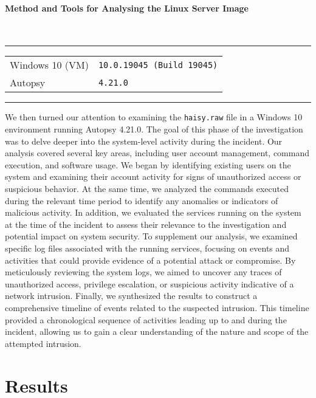 \paragraph{Method and Tools for Analysing the Linux Server Image}\mbox{}\\
\noindent\rule{\textwidth}{1pt}
\vspace{-0.8cm}
\begin{table}[h]
\begin{tabular}{ll}
Windows 10 (VM) & \texttt{10.0.19045 (Build 19045)}                                 \\
Autopsy      & \texttt{4.21.0}
\end{tabular}
\end{table}

\vspace{-0.8cm}
\noindent\rule{\textwidth}{1pt}
\vspace{-0.3cm}

\noindent We then turned our attention to examining the \texttt{haisy.raw} file in a Windows 10 environment running Autopsy 4.21.0. The goal of this phase of the investigation was to delve deeper into the system-level activity during the incident. Our analysis covered several key areas, including user account management, command execution, and software usage. We began by identifying existing users on the system and examining their account activity for signs of unauthorized access or suspicious behavior. At the same time, we analyzed the commands executed during the relevant time period to identify any anomalies or indicators of malicious activity. In addition, we evaluated the services running on the system at the time of the incident to assess their relevance to the investigation and potential impact on system security. To supplement our analysis, we examined specific log files associated with the running services, focusing on events and activities that could provide evidence of a potential attack or compromise. By meticulously reviewing the system logs, we aimed to uncover any traces of unauthorized access, privilege escalation, or suspicious activity indicative of a network intrusion. Finally, we synthesized the results to construct a comprehensive timeline of events related to the suspected intrusion. This timeline provided a chronological sequence of activities leading up to and during the incident, allowing us to gain a clear understanding of the nature and scope of the attempted intrusion.
\section{Results}
